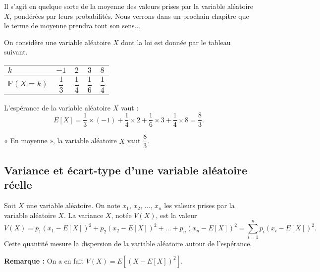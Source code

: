 \documentclass[11pt,fleqn, openany]{book} %
\begin{document}
Il s'agit en quelque sorte de la moyenne des valeurs prises par la variable aléatoire $X$, pondérées par leurs probabilités. Nous verrons dans un prochain chapitre que le terme de moyenne prendra tout son sens...
\newpage
\begin{example}On considère une variable aléatoire $X$ dont la loi est donnée par le tableau suivant.

\renewcommand{\arraystretch}{2.2}
\begin{center}
\begin{tabular}{|l|c|c|c|c|}
\hline
$k$ & $-1$& $2$ & $3$ & $8$ \\
\hline
$\mathbb{P}(X=k)$ & $\dfrac{1}{3}$ & $\dfrac{1}{4}$ & $\dfrac{1}{6}$ & $\dfrac{1}{4}$\\
\hline \end{tabular}
\end{center}


L'espérance de la variable aléatoire $X$ vaut :
\[ E[X]= \dfrac{1}{3} \times (-1) + \dfrac{1}{4} \times 2 + \dfrac{1}{6} \times 3 + \dfrac{1}{4} \times 8 = \dfrac{8}{3}.\]

« En moyenne », la variable aléatoire $X$ vaut $\dfrac{8}{3}$.\end{example}

\subsection{Variance et écart-type d'une variable aléatoire réelle}

\begin{definition}Soit $X$ une variable aléatoire. On note $x_1$, $x_2$, ..., $x_n$ les valeurs prises par la variable aléatoire $X$.
La variance $X$, notée $V(X)$, est la valeur
\[ V(X)= p_1(x_1-E[X])^2+p_2(x_2-E[X])^2+\ldots + p_n( x_n-E[X])^2 = \sum _{i=1}^{n} p_i (x_i-E[X])^2.\]
Cette quantité mesure la dispersion de la variable aléatoire autour de l'espérance.\end{definition}

\textbf{Remarque :} On a en fait $V(X)= E[ (X-E[X])^2 ]$.
\end{document}
